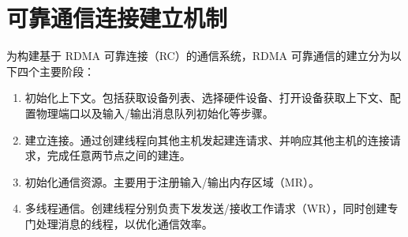 {    %



    \section{可靠通信连接建立机制}\label{sec:可靠通信连接建立机制}

    为构建基于 RDMA 可靠连接（RC）的通信系统，RDMA 可靠通信的建立分为以下四个主要阶段：

    \begin{enumerate}[label=\arabic*.]
        \item 初始化上下文。包括获取设备列表、选择硬件设备、打开设备获取上下文、配置物理端口以及输入/输出消息队列初始化等步骤。
        \item 建立连接。通过创建线程向其他主机发起建连请求、并响应其他主机的连接请求，完成任意两节点之间的建连。
        \item 初始化通信资源。主要用于注册输入/输出内存区域（MR）。
        \item 多线程通信。创建线程分别负责下发发送/接收工作请求（WR），同时创建专门处理消息的线程，以优化通信效率。
    \end{enumerate}

}

